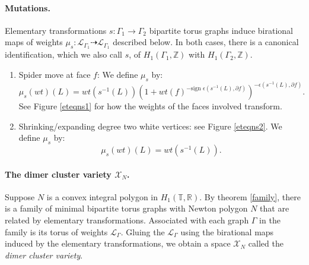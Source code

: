 \documentclass[11pt]{article} %
\theoremstyle{definition}
\newcommand{\Z}{{\mathbb Z}}
\newcommand{\R}{{\mathbb R}}
\newcommand{\T}{{\mathbb T}}
\newcommand{\ra}{\rightarrow}
\begin{document}
\paragraph{Mutations.} Elementary transformations $s:\Gamma_1 \ra \Gamma_2$ bipartite torus graphs induce birational maps of weights $\mu_s:\mathcal L_{\Gamma_1 } \dashrightarrow \mathcal L_{\Gamma_1 }$ described below. In both cases, there is a canonical identification, which we also call $s$, of $H_1(\Gamma_1,\Z)$ with $H_1(\Gamma_2,\Z)$.
\begin{enumerate}
    \item Spider move at face $f$: We define $\mu_s$ by:
    $$
    \mu_s(wt)(L)=wt(s^{-1}(L))\left(1+wt(f)^{-\text{sign }\epsilon(s^{-1}(L),\partial f)}\right)^{-\epsilon(s^{-1}(L),\partial f)}.
    $$
  See Figure \ref{eteqns1} for how the weights of the faces involved transform. 
    \item Shrinking/expanding degree two white vertices: see Figure \ref{eteqns2}.  We define $\mu_s$ by:
    $$
    \mu_s(wt)(L)=wt(s^{-1}(L)).
    $$
\end{enumerate}

\paragraph{The dimer cluster variety $\mathcal X_N$.} Suppose $N$ is a convex integral polygon in $H_1(\T,\R)$. By theorem \ref{family}, there is a family of minimal bipartite torus graphs with Newton polygon $N$ that are related by elementary transformations. Associated with each graph $\Gamma $ in the family is its torus of weights $\mathcal L_\Gamma$. Gluing the $\mathcal L_\Gamma$ using the birational maps induced by the elementary transformations, we obtain a space $\mathcal X_N$ called the {\it dimer cluster variety}.
\end{document}
